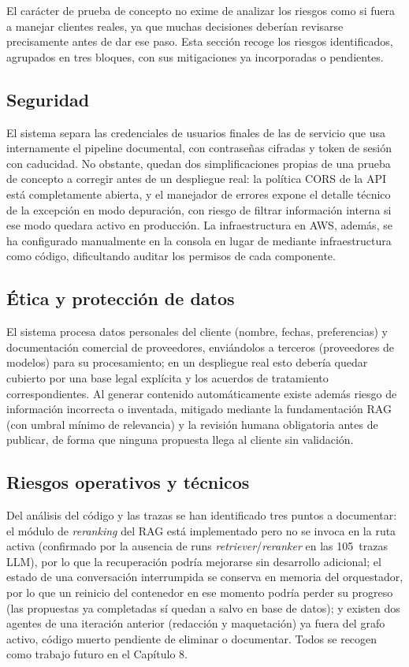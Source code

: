 El carácter de prueba de concepto no exime de analizar los riesgos como si fuera a manejar clientes reales, ya que muchas decisiones deberían revisarse precisamente antes de dar ese paso. Esta sección recoge los riesgos identificados, agrupados en tres bloques, con sus mitigaciones ya incorporadas o pendientes.

\subsection{Seguridad}
El sistema separa las credenciales de usuarios finales de las de servicio que usa internamente el pipeline documental, con contraseñas cifradas y token de sesión con caducidad. No obstante, quedan dos simplificaciones propias de una prueba de concepto a corregir antes de un despliegue real: la política CORS de la API está completamente abierta, y el manejador de errores expone el detalle técnico de la excepción en modo depuración, con riesgo de filtrar información interna si ese modo quedara activo en producción. La infraestructura en AWS, además, se ha configurado manualmente en la consola en lugar de mediante infraestructura como código, dificultando auditar los permisos de cada componente.

\subsection{Ética y protección de datos}
El sistema procesa datos personales del cliente (nombre, fechas, preferencias) y documentación comercial de proveedores, enviándolos a terceros (proveedores de modelos) para su procesamiento; en un despliegue real esto debería quedar cubierto por una base legal explícita y los acuerdos de tratamiento correspondientes. Al generar contenido automáticamente existe además riesgo de información incorrecta o inventada, mitigado mediante la fundamentación RAG (con umbral mínimo de relevancia) y la revisión humana obligatoria antes de publicar, de forma que ninguna propuesta llega al cliente sin validación.

\subsection{Riesgos operativos y técnicos}
Del análisis del código y las trazas se han identificado tres puntos a documentar: el módulo de \textit{reranking} del RAG está implementado pero no se invoca en la ruta activa (confirmado por la ausencia de runs \textit{retriever}/\textit{reranker} en las 105~trazas LLM), por lo que la recuperación podría mejorarse sin desarrollo adicional; el estado de una conversación interrumpida se conserva en memoria del orquestador, por lo que un reinicio del contenedor en ese momento podría perder su progreso (las propuestas ya completadas sí quedan a salvo en base de datos); y existen dos agentes de una iteración anterior (redacción y maquetación) ya fuera del grafo activo, código muerto pendiente de eliminar o documentar. Todos se recogen como trabajo futuro en el Capítulo 8.
